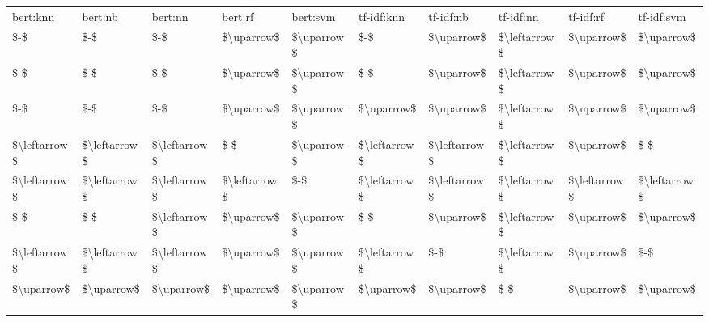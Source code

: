 \begin{tabular}{llllllllll}
\toprule
    bert:knn &      bert:nb &      bert:nn &      bert:rf &   bert:svm &   tf-idf:knn &    tf-idf:nb &    tf-idf:nn &    tf-idf:rf &   tf-idf:svm \\
         \$-\$ &          \$-\$ &          \$-\$ &   \$\textbackslash uparrow\$ & \$\textbackslash uparrow\$ &          \$-\$ &   \$\textbackslash uparrow\$ & \$\textbackslash leftarrow\$ &   \$\textbackslash uparrow\$ &   \$\textbackslash uparrow\$ \\
\midrule
         \$-\$ &          \$-\$ &          \$-\$ &   \$\textbackslash uparrow\$ & \$\textbackslash uparrow\$ &          \$-\$ &   \$\textbackslash uparrow\$ & \$\textbackslash leftarrow\$ &   \$\textbackslash uparrow\$ &   \$\textbackslash uparrow\$ \\
         \$-\$ &          \$-\$ &          \$-\$ &   \$\textbackslash uparrow\$ & \$\textbackslash uparrow\$ &   \$\textbackslash uparrow\$ &   \$\textbackslash uparrow\$ & \$\textbackslash leftarrow\$ &   \$\textbackslash uparrow\$ &   \$\textbackslash uparrow\$ \\
\$\textbackslash leftarrow\$ & \$\textbackslash leftarrow\$ & \$\textbackslash leftarrow\$ &          \$-\$ & \$\textbackslash uparrow\$ & \$\textbackslash leftarrow\$ & \$\textbackslash leftarrow\$ & \$\textbackslash leftarrow\$ &   \$\textbackslash uparrow\$ &          \$-\$ \\
\$\textbackslash leftarrow\$ & \$\textbackslash leftarrow\$ & \$\textbackslash leftarrow\$ & \$\textbackslash leftarrow\$ &        \$-\$ & \$\textbackslash leftarrow\$ & \$\textbackslash leftarrow\$ & \$\textbackslash leftarrow\$ & \$\textbackslash leftarrow\$ & \$\textbackslash leftarrow\$ \\
         \$-\$ &          \$-\$ & \$\textbackslash leftarrow\$ &   \$\textbackslash uparrow\$ & \$\textbackslash uparrow\$ &          \$-\$ &   \$\textbackslash uparrow\$ & \$\textbackslash leftarrow\$ &   \$\textbackslash uparrow\$ &   \$\textbackslash uparrow\$ \\
\$\textbackslash leftarrow\$ & \$\textbackslash leftarrow\$ & \$\textbackslash leftarrow\$ &   \$\textbackslash uparrow\$ & \$\textbackslash uparrow\$ & \$\textbackslash leftarrow\$ &          \$-\$ & \$\textbackslash leftarrow\$ &   \$\textbackslash uparrow\$ &          \$-\$ \\
  \$\textbackslash uparrow\$ &   \$\textbackslash uparrow\$ &   \$\textbackslash uparrow\$ &   \$\textbackslash uparrow\$ & \$\textbackslash uparrow\$ &   \$\textbackslash uparrow\$ &   \$\textbackslash uparrow\$ &          \$-\$ &   \$\textbackslash uparrow\$ &   \$\textbackslash uparrow\$ \\

\end{tabular}
